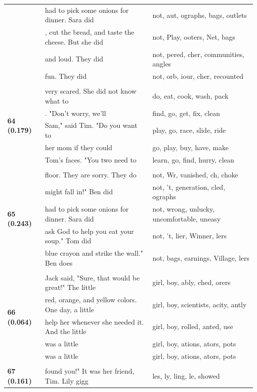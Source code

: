 \documentclass{article}
\theoremstyle{plain}
\theoremstyle{definition}
\theoremstyle{remark}
\begin{document}
\begin{longtable}{|p{}|p{}|p{}|}
& had to pick some onions for dinner. Sara did & not,  aut, ographs, bags,  outlets \\
& , cut the bread, and taste the cheese. But she did & not, Play, ooters, Net, bags \\
& and loud. They did & not, pered, cher,  communities, angles \\
& fun. They did & not,  orb, iour, cher,  recounted \\
& & \\
\multirow{5}{*}{\textbf{64 (0.179)}} & very scared. She did not know what to & do,  eat,  cook,  wash,  pack \\
& . "Don't worry, we'll & find,  go,  get,  fix,  clean \\
& Sam," said Tim. "Do you want to & play,  go,  race,  slide,  ride \\
& her mom if they could & go,  play,  buy,  have,  make \\
& Tom's faces.  "You two need to & learn,  go,  find,  hurry,  clean \\
& & \\
\multirow{5}{*}{\textbf{65 (0.243)}} & floor. They are sorry. They do & not, Wr,  vanished, ch,  choke \\
& might fall in!"  Ben did & not, 't,  generation, cled, ographs \\
& had to pick some onions for dinner. Sara did & not,  wrong,  unlucky,  uncomfortable,  uneasy \\
& ask God to help you eat your soup."  Tom did & not, 't, lier, Winner, lers \\
& blue crayon and strike the wall."  Ben does & not, bags,  earnings,  Village, lers \\
& & \\
\multirow{5}{*}{\textbf{66 (0.064)}} & Jack said, "Sure, that would be great!" The little & girl,  boy, ably, ched, orers \\
& red, orange, and yellow colors. One day, a little & girl,  boy,  scientists, acity, antly \\
& help her whenever she needed it. And the little & girl,  boy, rolled, anted, use \\
& was a little & girl,  boy, ations, ators, pots \\
& was a little & girl,  boy, ations, ators, pots \\
& & \\
\multirow{5}{*}{\textbf{67 (0.161)}} & found you!" It was her friend, Tim.   Lily gigg & les, ly, ling, le,  showed \\

\end{longtable}
\end{document}
